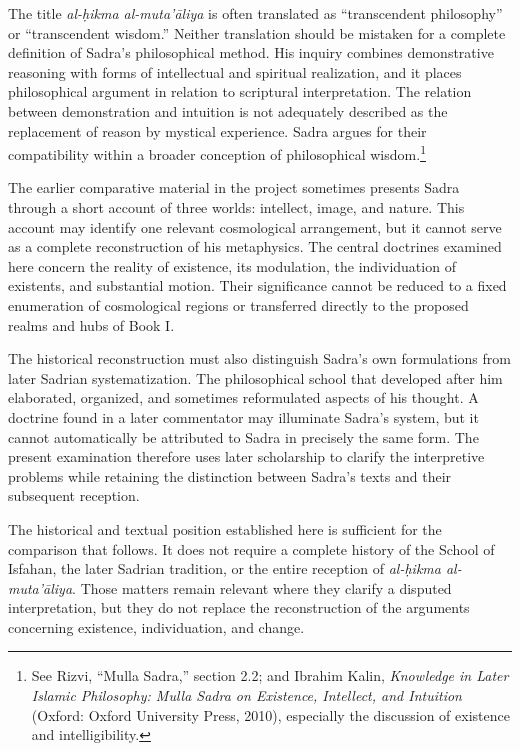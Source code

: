 The title \textit{al-ḥikma al-muta'āliya} is
often translated as ``transcendent philosophy''
or ``transcendent wisdom.'' Neither translation
should be mistaken for a complete definition of
Sadra's philosophical method. His inquiry
combines demonstrative reasoning with forms
of intellectual and spiritual realization, and
it places philosophical argument in relation
to scriptural interpretation. The relation
between demonstration and intuition is not
adequately described as the replacement of
reason by mystical experience. Sadra argues
for their compatibility within a broader
conception of philosophical wisdom.\footnote{See
Rizvi, ``Mulla Sadra,'' section 2.2; and
Ibrahim Kalin, \textit{Knowledge in Later
Islamic Philosophy: Mulla Sadra on Existence,
Intellect, and Intuition} (Oxford: Oxford
University Press, 2010), especially the
discussion of existence and intelligibility.}

\label{para:VS.B01.P01.C08.S17.SS02.P004}

The earlier comparative material in the
project sometimes presents Sadra through a
short account of three worlds: intellect,
image, and nature. This account may identify
one relevant cosmological arrangement, but
it cannot serve as a complete reconstruction
of his metaphysics. The central doctrines
examined here concern the reality of existence,
its modulation, the individuation of existents,
and substantial motion. Their significance
cannot be reduced to a fixed enumeration of
cosmological regions or transferred directly
to the proposed realms and hubs of Book I.

\label{para:VS.B01.P01.C08.S17.SS02.P005}

The historical reconstruction must also
distinguish Sadra's own formulations from
later Sadrian systematization. The philosophical
school that developed after him elaborated,
organized, and sometimes reformulated aspects
of his thought. A doctrine found in a later
commentator may illuminate Sadra's system,
but it cannot automatically be attributed
to Sadra in precisely the same form. The
present examination therefore uses later
scholarship to clarify the interpretive
problems while retaining the distinction
between Sadra's texts and their subsequent
reception.

\label{para:VS.B01.P01.C08.S17.SS02.P006}

The historical and textual position established
here is sufficient for the comparison that
follows. It does not require a complete history
of the School of Isfahan, the later Sadrian
tradition, or the entire reception of
\textit{al-ḥikma al-muta'āliya}. Those matters
remain relevant where they clarify a disputed
interpretation, but they do not replace the
reconstruction of the arguments concerning
existence, individuation, and change.

